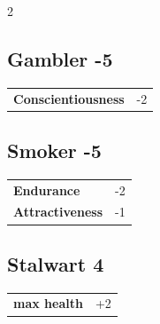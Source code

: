 \begin{multicols}{2}
\begin{tcolorbox}
\end{tcolorbox}

\begin{tcolorbox}
    \subsection*{Gambler \hfill \small{-5 }}
    \tcblower




\begin{tabular}{@{}ll@{}}
    \textbf{Conscientiousness} & -2\\
\end{tabular}


\end{tcolorbox}

\begin{tcolorbox}
    \subsection*{Smoker \hfill \small{-5 }}
    \tcblower




\begin{tabular}{@{}ll@{}}
    \textbf{Endurance} & -2\\
    \textbf{Attractiveness} & -1\\
\end{tabular}


\end{tcolorbox}

\begin{tcolorbox}
    \subsection*{Stalwart \hfill \small{4 }}
    \tcblower




\begin{tabular}{@{}ll@{}}
    \textbf{max health} & +2\\
\end{tabular}



\end{tcolorbox}
\end{multicols}

